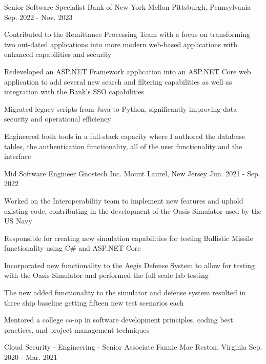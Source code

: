 \begin{cventries}
  \cventry
    {Senior Software Specialist}
    {Bank of New York Mellon}
    {Pittsburgh, Pennsylvania}
    {Sep. 2022 - Nov. 2023}
    {
      \begin{cvitems}
        \item {Contributed to the Remittance Processing Team with a focus on transforming two out-dated applications into more modern web-based applications with enhanced capabilities and security}
        \item {Redeveloped an ASP.NET Framework application into an ASP.NET Core web application to add several new search and filtering capabilities as well as integration with the Bank's SSO capabilities}
        \item {Migrated legacy scripts from Java to Python, significantly improving data security and operational efficiency}
        \item {Engineered both tools in a full-stack capacity where I authored the database tables, the authentication functionality, all of the user functionality and the interface}
      \end{cvitems}
    }
  \cventry
    {Mid Software Engineer}
    {Gnostech Inc.}
    {Mount Laurel, New Jersey}
    {Jun. 2021 - Sep. 2022}
    {
      \begin{cvitems}
        \item {Worked on the Interoperability team to implement new features and uphold existing code, contributing in the development of the Oasis Simulator used by the US Navy}
        \item {Responsible for creating new simulation capabilities for testing Ballistic Missile functionality using C\# and ASP.NET Core}
        \item {Incorporated new functionality to the Aegis Defense System to allow for testing with the Oasis Simulator and performed the full scale lab testing}
        \item {The new added functionality to the simulator and defense system resulted in three ship baseline getting fifteen new test scenarios each}
        \item {Mentored a college co-op in software development principles, coding best practices, and project management techniques}
      \end{cvitems}
    }
  \cventry
    {Cloud Security - Engineering - Senior Associate}
    {Fannie Mae}
    {Reston, Virginia}
    {Sep. 2020 - Mar. 2021}
    {
      \begin{cvitems}

\end{cvitems}}
\end{cventries}
